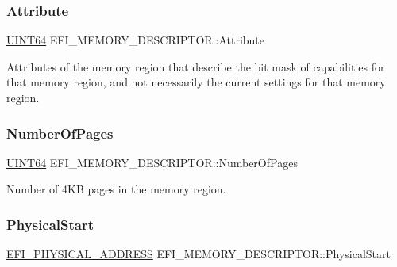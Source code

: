 \subsubsection{\texorpdfstring{Attribute}{Attribute}}
{\footnotesize\ttfamily \hyperlink{_processor_bind_8h_a57be03562867144161c1bfee95ca8f7c}{U\+I\+N\+T64} E\+F\+I\+\_\+\+M\+E\+M\+O\+R\+Y\+\_\+\+D\+E\+S\+C\+R\+I\+P\+T\+O\+R\+::\+Attribute}

Attributes of the memory region that describe the bit mask of capabilities for that memory region, and not necessarily the current settings for that memory region. \mbox{\label{struct_e_f_i___m_e_m_o_r_y___d_e_s_c_r_i_p_t_o_r_ab9624afb67a7adb70a5ec58f937461b2}} 
\subsubsection{\texorpdfstring{Number\+Of\+Pages}{NumberOfPages}}
{\footnotesize\ttfamily \hyperlink{_processor_bind_8h_a57be03562867144161c1bfee95ca8f7c}{U\+I\+N\+T64} E\+F\+I\+\_\+\+M\+E\+M\+O\+R\+Y\+\_\+\+D\+E\+S\+C\+R\+I\+P\+T\+O\+R\+::\+Number\+Of\+Pages}

Number of 4\+KB pages in the memory region. \mbox{\label{struct_e_f_i___m_e_m_o_r_y___d_e_s_c_r_i_p_t_o_r_afe2d9ce095ab1c1076c87cb95c1fa75a}} 
\subsubsection{\texorpdfstring{Physical\+Start}{PhysicalStart}}
{\footnotesize\ttfamily \hyperlink{_uefi_base_type_8h_a31bc7e7faeab8d2940ee34f21d41cd04}{E\+F\+I\+\_\+\+P\+H\+Y\+S\+I\+C\+A\+L\+\_\+\+A\+D\+D\+R\+E\+SS} E\+F\+I\+\_\+\+M\+E\+M\+O\+R\+Y\+\_\+\+D\+E\+S\+C\+R\+I\+P\+T\+O\+R\+::\+Physical\+Start}

